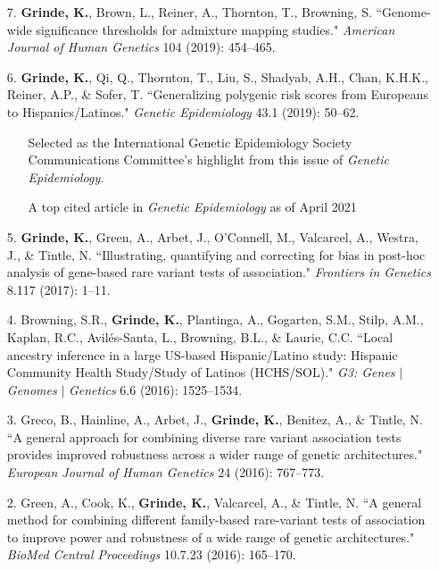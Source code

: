 \documentclass[margin]{res}
\begin{document}
\begin{resume}
\begin{itemize}
\item[7.] \textbf{Grinde, K.}, Brown, L., Reiner, A., Thornton, T., Browning, S. ``Genome-wide significance thresholds for admixture mapping studies." \textit{American Journal of Human Genetics} 104 (2019): 454--465. 

\item[6.] \textbf{Grinde, K.}, Qi, Q., Thornton, T., Liu, S., Shadyab, A.H., Chan, K.H.K., Reiner, A.P., \& Sofer, T. ``Generalizing polygenic risk scores from Europeans to Hispanics/Latinos." \textit{Genetic Epidemiology} 43.1 (2019): 50--62. 
	\begin{itemize} \itemsep -2pt
	\item[] Selected as the International Genetic Epidemiology Society Communications Committee's highlight from this issue of \textit{Genetic Epidemiology}.
	\item[] A top cited article in \textit{Genetic Epidemiology} as of April 2021
	\end{itemize}
 
\item[5.] \textbf{Grinde, K.}, Green, A., Arbet, J., O'Connell, M., Valcarcel, A., Westra, J., \& Tintle, N. ``Illustrating, quantifying and correcting for bias in post-hoc analysis of gene-based rare variant tests of association." \textit{Frontiers in Genetics} 8.117 (2017): 1--11. 

\item[4.] Browning, S.R., \textbf{Grinde, K.}, Plantinga, A., Gogarten, S.M., Stilp, A.M., Kaplan, R.C., Avil\'es-Santa, L., Browning, B.L., \& Laurie, C.C. ``Local ancestry inference in a large US-based Hispanic/Latino study: Hispanic Community Health Study/Study of Latinos (HCHS/SOL)." \textit{G3: Genes} $|$ \textit{Genomes} $|$ \textit{Genetics} 6.6 (2016): 1525--1534.

\item[3.] Greco, B., Hainline, A., Arbet, J., \textbf{Grinde, K.}, Benitez, A., \& Tintle, N. ``A general approach for combining diverse rare variant association tests provides improved robustness across a wider range of genetic architectures." \textit{European Journal of Human Genetics} 24 (2016): 767--773.

\item[2.] Green, A., Cook, K., \textbf{Grinde, K.}, Valcarcel, A., \& Tintle, N. ``A general method for combining different family-based rare-variant tests of association to improve power and robustness of a wide range of genetic architectures." \textit{BioMed Central Proceedings} 10.7.23 (2016): 165--170.


\end{itemize}
\end{resume}
\end{document}
